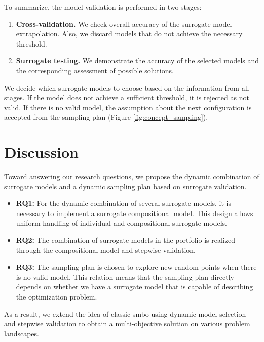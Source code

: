         To summarize, the model validation is performed in two stages:
        \begin{enumerate}
            \item \textbf{Cross-validation.} We check overall accuracy of the surrogate model extrapolation. Also, we discard models that do not achieve the necessary threshold.
            \item \textbf{Surrogate testing.} We demonstrate the accuracy of the selected models and the corresponding assessment of possible solutions.
        \end{enumerate}
        
        We decide which surrogate models to choose based on the information from all stages. If the model does not achieve a sufficient threshold, it is rejected as not valid. If there is no valid model, the assumption about the next configuration is accepted from the sampling plan (Figure \ref{fig:concept_sampling}).


    \section{Discussion}
        Toward answering our research questions, we propose the dynamic combination of surrogate models and a dynamic sampling plan based on surrogate validation.
        \begin{itemize}
            \item \textbf{RQ1:} For the dynamic combination of several surrogate models, it is necessary to implement a surrogate compositional model. This design allows uniform handling of individual and compositional surrogate models.
            \item \textbf{RQ2:} The combination of surrogate models in the portfolio is realized through the compositional model and stepwise validation.
            \item \textbf{RQ3:} The sampling plan is chosen to explore new random points when there is no valid model. This relation means that the sampling plan directly depends on whether we have a surrogate model that is capable of describing the optimization problem.
        \end{itemize}
         
        As a result, we extend the idea of classic \gls{smbo} using dynamic model selection and stepwise validation to obtain a multi-objective solution on various problem landscapes. 
